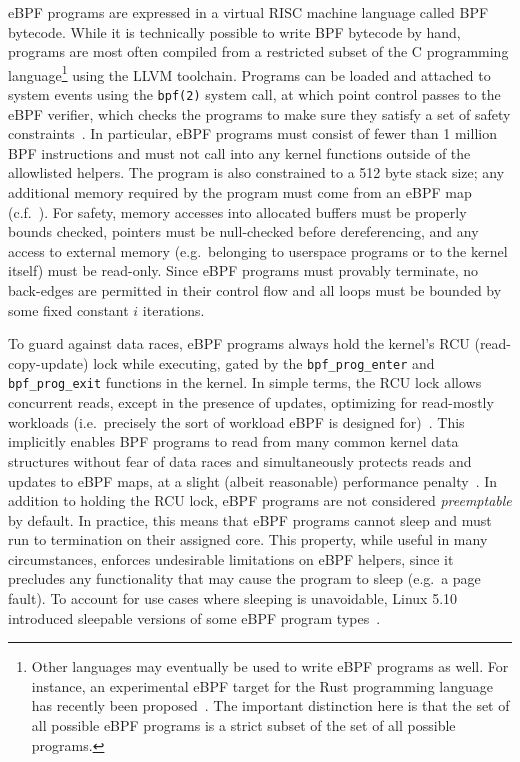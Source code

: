 eBPF programs are expressed in a virtual RISC machine language called BPF bytecode.  While
it is technically possible to write BPF bytecode by hand, programs are most often compiled
from a restricted subset of the C programming language\footnote{Other languages may
eventually be used to write eBPF programs as well.  For instance, an experimental eBPF
target for the Rust programming language has recently been
proposed~\cite{decina2021_bpf_rust}. The important distinction here is that the set of all
possible eBPF programs is a strict subset of the set of all possible programs.} using the
LLVM toolchain. Programs can be loaded and attached to system events using the
\texttt{bpf(2)} system call, at which point control passes to the eBPF verifier, which
checks the programs to make sure they satisfy a set of safety
constraints~\cite{starovoitov2014_ebpf, gregg2019_bpf}. In particular, eBPF programs must
consist of fewer than 1 million BPF instructions and must not call into any kernel
functions outside of the allowlisted helpers. The program is also constrained to a 512
byte stack size; any additional memory required by the program must come from an eBPF map
(c.f.~). For safety, memory accesses into allocated buffers must be
properly bounds checked, pointers must be null-checked before dereferencing, and any
access to external memory (e.g.~belonging to userspace programs or to the kernel itself)
must be read-only. Since eBPF programs must provably terminate, no back-edges are
permitted in their control flow and all loops must be bounded by some fixed constant $i$
iterations.

To guard against data races, eBPF programs always hold the kernel's RCU (read-copy-update)
lock while executing, gated by the \texttt{bpf\_prog\_enter} and \texttt{bpf\_prog\_exit}
functions in the kernel. In simple terms, the RCU lock allows concurrent reads, except in
the presence of updates, optimizing for read-mostly workloads (i.e.~precisely the sort of
workload eBPF is designed for)~\cite{mckenney2007_rcu}. This implicitly enables BPF
programs to read from many common kernel data structures without fear of data races and
simultaneously protects reads and updates to eBPF maps, at a slight (albeit reasonable)
performance penalty~\cite{mckenney2007_rcu}. In addition to holding the RCU lock, eBPF
programs are not considered \textit{preemptable} by default. In practice, this means that
eBPF programs cannot sleep and must run to termination on their assigned core. This
property, while useful in many circumstances, enforces undesirable limitations on eBPF
helpers, since it precludes any functionality that may cause the program to sleep (e.g.~a
page fault). To account for use cases where sleeping is unavoidable, Linux 5.10 introduced
sleepable versions of some eBPF program types~\cite{starovoitov2020_sleepable}.

